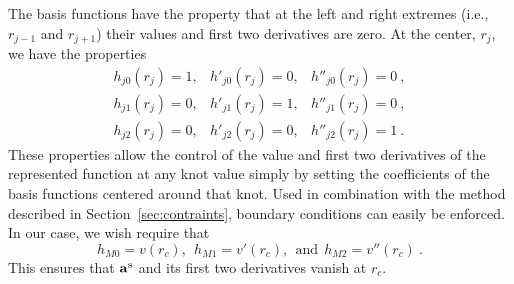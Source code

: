 The basis functions have the property that at the left and right
extremes (i.e., $r_{j-1}$ and $r_{j+1}$) their values and first two
derivatives are zero.  At the center, $r_j$, we have the properties
\begin{eqnarray}
h_{j0}(r_j)=1, & h'_{j0}(r_j)=0, & h''_{j0}(r_j)= 0\:, \\
h_{j1}(r_j)=0, & h'_{j1}(r_j)=1, & h''_{j1}(r_j)= 0\:, \\
h_{j2}(r_j)=0, & h'_{j2}(r_j)=0, & h''_{j2}(r_j)= 1\:. 
\end{eqnarray}
These properties allow the control of the value and first two derivatives
of the represented function at any knot value simply by setting the
coefficients of the basis functions centered around that knot.  Used
in combination with the method described in
Section~\ref{sec:contraints}, boundary conditions can easily be
enforced.  In our case, we wish require that
\begin{equation}
h_{M0} = v(r_c), \ \ h_{M1} = v'(r_c), \ \ \text{and} \ \  h_{M2} = v''(r_c)\:.
\end{equation}
This ensures that $\mathbf{a}^{\text{s}}$ and its first two derivatives vanish at $r_c$.

